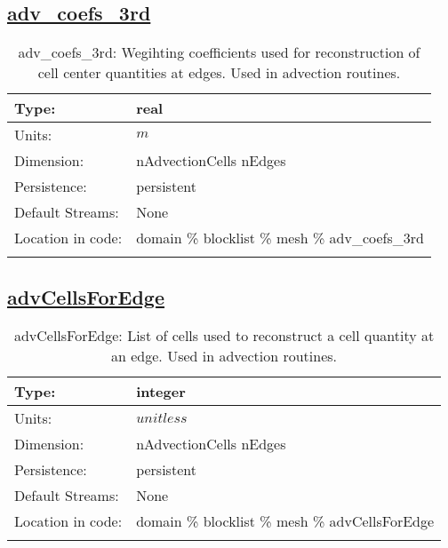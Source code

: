 \subsection[adv\_coefs\_3rd]{\hyperref[sec:var_tab_mesh]{adv\_coefs\_3rd}}
\label{subsec:var_sec_mesh_adv_coefs_3rd}
\begin{center}
\begin{longtable}{| p{2.0in} | p{4.0in} |}
        \hline 
        Type: & real \\
        \hline 
        Units: & $m$ \\
        \hline 
        Dimension: & nAdvectionCells nEdges \\
        \hline 
        Persistence: & persistent \\
        \hline 
		 Default Streams: & None \\
        \hline 
		 Location in code: & domain \% blocklist \% mesh \% adv\_coefs\_3rd \\
		 \hline 
    \caption{adv\_coefs\_3rd: Wegihting coefficients used for reconstruction of cell center quantities at edges. Used in advection routines.}
\end{longtable}
\end{center}
\subsection[advCellsForEdge]{\hyperref[sec:var_tab_mesh]{advCellsForEdge}}
\label{subsec:var_sec_mesh_advCellsForEdge}
\begin{center}
\begin{longtable}{| p{2.0in} | p{4.0in} |}
        \hline 
        Type: & integer \\
        \hline 
        Units: & $unitless$ \\
        \hline 
        Dimension: & nAdvectionCells nEdges \\
        \hline 
        Persistence: & persistent \\
        \hline 
		 Default Streams: & None \\
        \hline 
		 Location in code: & domain \% blocklist \% mesh \% advCellsForEdge \\
		 \hline 
    \caption{advCellsForEdge: List of cells used to reconstruct a cell quantity at an edge. Used in advection routines.}
\end{longtable}
\end{center}
